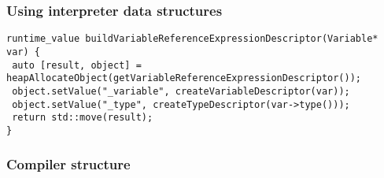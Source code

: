 \begin{frame}[fragile]
    \frametitle{Using interpreter data structures}

    \begin{lstlisting}
runtime_value buildVariableReferenceExpressionDescriptor(Variable* var) {
 auto [result, object] = heapAllocateObject(getVariableReferenceExpressionDescriptor());
 object.setValue("_variable", createVariableDescriptor(var));
 object.setValue("_type", createTypeDescriptor(var->type()));
 return std::move(result);
}
    \end{lstlisting}

\end{frame}

\begin{frame}
    \frametitle{Compiler structure}

    

\end{frame}
